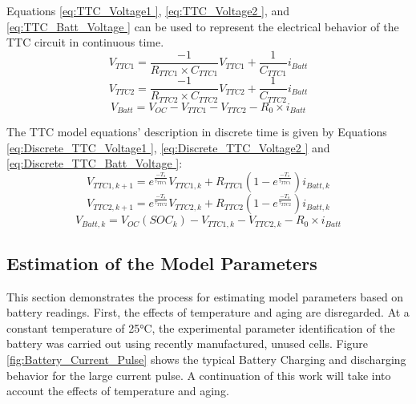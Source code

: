 Equations \ref{eq:TTC_Voltage1 }, \ref{eq:TTC_Voltage2 }, and \ref{eq:TTC_Batt_Voltage } can be used to represent the electrical behavior of the TTC circuit in continuous time.
\begin{equation}\label{eq:TTC_Voltage1 }
    V_{TTC1} = \frac{-1}{R_{TTC1}\times C_{TTC1}} V_{TTC1} + \frac{1}{C_{TTC1}} i_{Batt}
\end{equation}
\begin{equation}\label{eq:TTC_Voltage2 }
    V_{TTC2} = \frac{-1}{R_{TTC2}\times C_{TTC2}} V_{TTC2} + \frac{1}{C_{TTC2}} i_{Batt}
\end{equation}
\begin{equation}\label{eq:TTC_Batt_Voltage }
    V_{Batt} = V_{OC} -  V_{TTC1} - V_{TTC2} - R_{0}\times i_{Batt}
\end{equation}

The TTC model equations' description in discrete time is given by Equations \ref{eq:Discrete_TTC_Voltage1 }, \ref{eq:Discrete_TTC_Voltage2 } and \ref{eq:Discrete_TTC_Batt_Voltage }:
\begin{equation}\label{eq:Discrete_TTC_Voltage1 }
    V_{TTC1,k+1} = e^{\frac{-T_{s}}{\tau_{TTC1}}} V_{TTC1,k} + R_{TTC1}\left(1- e^{\frac{-T_{s}}{\tau_{TTC1}}}\right) i_{Batt,k}
\end{equation}
\begin{equation}\label{eq:Discrete_TTC_Voltage2 }
    V_{TTC2,k+1} = e^{\frac{-T_{s}}{\tau_{TTC2}}} V_{TTC2,k} + R_{TTC2}\left(1- e^{\frac{-T_{s}}{\tau_{TTC2}}}\right) i_{Batt,k}
\end{equation}
\begin{equation}\label{eq:Discrete_TTC_Batt_Voltage }
    V_{Batt,k} = V_{OC}(SOC_{k}) -  V_{TTC1,k}-  V_{TTC2,k} - R_{0}\times i_{Batt}
\end{equation}


\subsection{Estimation of the Model Parameters}\label{sec:Batt_model_parameters_estimation}
This section demonstrates the process for estimating model parameters based on battery readings. First, the effects of temperature and aging are disregarded. At a constant temperature of 25°C, the experimental parameter identification of the battery was carried out using recently manufactured, unused cells. Figure \ref{fig:Battery_Current_Pulse} shows the typical Battery Charging and discharging behavior for the large current pulse. A continuation of this work will take into account the effects of temperature and aging.
